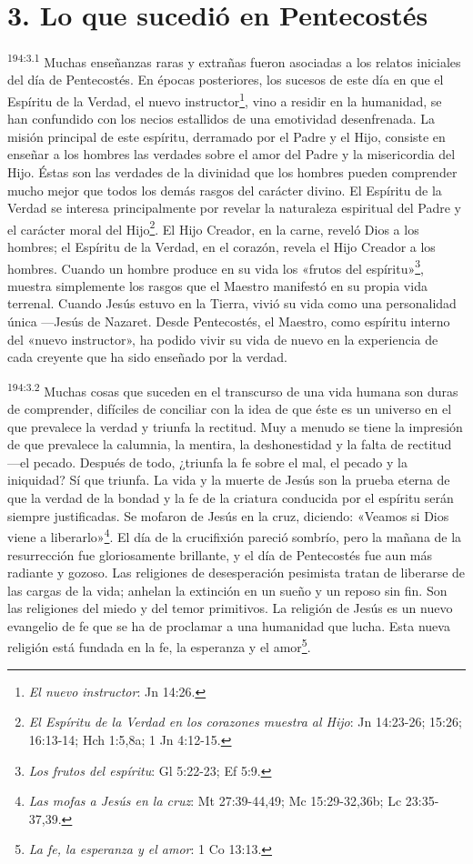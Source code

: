 \section*{3. Lo que sucedió en Pentecostés}
\par 
\textsuperscript{194:3.1} Muchas enseñanzas raras y extrañas fueron asociadas a los relatos iniciales del día de Pentecostés. En épocas posteriores, los sucesos de este día en que el Espíritu de la Verdad, el nuevo instructor\footnote{\textit{El nuevo instructor}: Jn 14:26.}, vino a residir en la humanidad, se han confundido con los necios estallidos de una emotividad desenfrenada. La misión principal de este espíritu, derramado por el Padre y el Hijo, consiste en enseñar a los hombres las verdades sobre el amor del Padre y la misericordia del Hijo. Éstas son las verdades de la divinidad que los hombres pueden comprender mucho mejor que todos los demás rasgos del carácter divino. El Espíritu de la Verdad se interesa principalmente por revelar la naturaleza espiritual del Padre y el carácter moral del Hijo\footnote{\textit{El Espíritu de la Verdad en los corazones muestra al Hijo}: Jn 14:23-26; 15:26; 16:13-14; Hch 1:5,8a; 1 Jn 4:12-15.}. El Hijo Creador, en la carne, reveló Dios a los hombres; el Espíritu de la Verdad, en el corazón, revela el Hijo Creador a los hombres. Cuando un hombre produce en su vida los «frutos del espíritu»\footnote{\textit{Los frutos del espíritu}: Gl 5:22-23; Ef 5:9.}, muestra simplemente los rasgos que el Maestro manifestó en su propia vida terrenal. Cuando Jesús estuvo en la Tierra, vivió su vida como una personalidad única ---Jesús de Nazaret. Desde Pentecostés, el Maestro, como espíritu interno del «nuevo instructor», ha podido vivir su vida de nuevo en la experiencia de cada creyente que ha sido enseñado por la verdad.

\par 
\textsuperscript{194:3.2} Muchas cosas que suceden en el transcurso de una vida humana son duras de comprender, difíciles de conciliar con la idea de que éste es un universo en el que prevalece la verdad y triunfa la rectitud. Muy a menudo se tiene la impresión de que prevalece la calumnia, la mentira, la deshonestidad y la falta de rectitud ---el pecado. Después de todo, ¿triunfa la fe sobre el mal, el pecado y la iniquidad? Sí que triunfa. La vida y la muerte de Jesús son la prueba eterna de que la verdad de la bondad y la fe de la criatura conducida por el espíritu serán siempre justificadas. Se mofaron de Jesús en la cruz, diciendo: «Veamos si Dios viene a liberarlo»\footnote{\textit{Las mofas a Jesús en la cruz}: Mt 27:39-44,49; Mc 15:29-32,36b; Lc 23:35-37,39.}. El día de la crucifixión pareció sombrío, pero la mañana de la resurrección fue gloriosamente brillante, y el día de Pentecostés fue aun más radiante y gozoso. Las religiones de desesperación pesimista tratan de liberarse de las cargas de la vida; anhelan la extinción en un sueño y un reposo sin fin. Son las religiones del miedo y del temor primitivos. La religión de Jesús es un nuevo evangelio de fe que se ha de proclamar a una humanidad que lucha. Esta nueva religión está fundada en la fe, la esperanza y el amor\footnote{\textit{La fe, la esperanza y el amor}: 1 Co 13:13.}.

